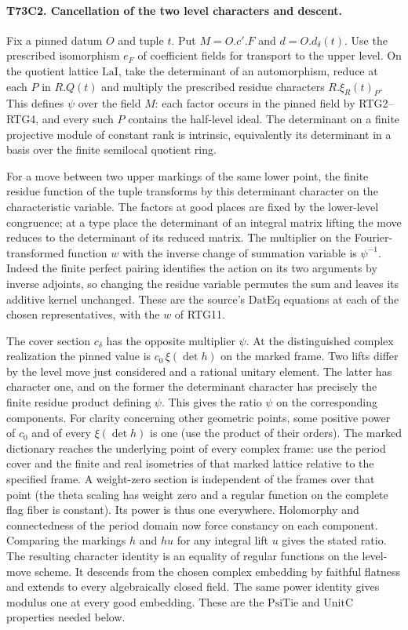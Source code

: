 \paragraph{T73C2. Cancellation of the two level characters and descent.}
Fix a pinned datum $O$ and tuple $t$. Put $M=O.c'.F$ and
$d=O.d_\delta(t)$. Use the prescribed isomorphism $e_F$ of coefficient
fields for transport to the upper level. On the quotient lattice
$\mathrm{LaI}$, take the determinant of an automorphism, reduce at
each $P$ in $R.Q(t)$ and multiply the prescribed residue characters
$R.\xi_R(t)_P$. This defines $\psi$ over the field $M$: each factor
occurs in the pinned field by RTG2--RTG4, and every such $P$ contains
the half-level ideal. The determinant on a finite projective module
of constant rank is intrinsic, equivalently its determinant in a
basis over the finite semilocal quotient ring.

For a move between two upper markings of the same lower point,
the finite residue function of the tuple transforms by this
determinant character on the characteristic variable. The factors
at good places are fixed by the lower-level congruence; at a type
place the determinant of an integral matrix lifting the move reduces
to the determinant of its reduced matrix. The multiplier on the
Fourier-transformed function $w$ with the inverse change of summation
variable is $\psi^{-1}$. Indeed the finite perfect pairing identifies
the action on its two arguments by inverse adjoints, so changing the
residue variable permutes the sum and leaves its additive kernel
unchanged. These are the source's $\mathrm{DatEq}$ equations at
each of the chosen representatives, with the $w$ of RTG11.

The cover section $c_\delta$ has the opposite multiplier $\psi$.
At the distinguished complex realization the pinned value is
$c_0\,\xi(\det h)$ on the marked frame. Two lifts differ by the
level move just considered and a rational unitary element. The latter
has character one, and on the former the determinant character
has precisely the finite residue product defining $\psi$.
This gives the ratio $\psi$ on the corresponding components.
For clarity concerning other geometric points, some positive power
of $c_0$ and of every $\xi(\det h)$ is one (use the product of their
orders). The marked dictionary reaches the underlying point of every complex frame:
use the period cover and the finite and real isometries of that marked
lattice relative to the specified frame. A weight-zero section is
independent of the frames over that point (the theta scaling has
weight zero and a regular function on the complete flag fiber is constant).
Its power is thus one everywhere. Holomorphy and connectedness of the
period domain now force constancy on each component. Comparing the
markings $h$ and $hu$ for any integral lift $u$ gives the stated ratio.
The resulting character identity is an equality of regular
functions on the level-move scheme. It descends from the chosen
complex embedding by faithful flatness and extends to every
algebraically closed field. The same power identity gives modulus
one at every good embedding. These are the $\mathrm{PsiTie}$ and
$\mathrm{UnitC}$ properties needed below.

